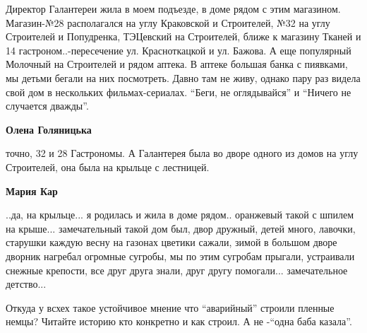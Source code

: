 \begin{itemize}

Директор Галантереи жила в моем подъезде, в доме рядом с этим магазином.
Магазин-№28 располагался на углу Краковской и Строителей, №32 на углу
Строителей и Попудренка, ТЭЦевский на Строителей, ближе к магазину Тканей и 14
гастроном..-пересечение ул. Красноткацкой и ул. Бажова. А еще популярный
Молочный на Строителей и рядом аптека. В аптеке большая банка с пиявками, мы
детьми бегали на них посмотреть. Давно там не живу, однако пару раз видела свой
дом в нескольких фильмах-сериалах. \enquote{Беги, не оглядывайся} и \enquote{Ничего не
случается дважды}.

\begin{itemize} %
\textbf{Олена Голяницька} 

точно, 32 и 28 Гастрономы. А Галантерея была во дворе одного из домов на углу
Строителей, она была на крыльце с лестницей.


\textbf{Мария Кар} 

..да, на крыльце... я родилась и жила в доме рядом.. оранжевый такой с шпилем на
крыше... замечательный такой дом был, двор дружный, детей много, лавочки,
старушки каждую весну на газонах цветики сажали, зимой в большом дворе дворник
нагребал огромные сугробы, мы по этим сугробам прыгали, устраивали снежные
крепости, все друг друга знали, друг другу помогали... замечательное детство...

\end{itemize} %


Откуда у всхех такое устойчивое мнение что \enquote{аварийный} строили пленные немцы?
Читайте историю кто конкретно и как строил. А не -\enquote{одна баба казала}.

\end{itemize} %
